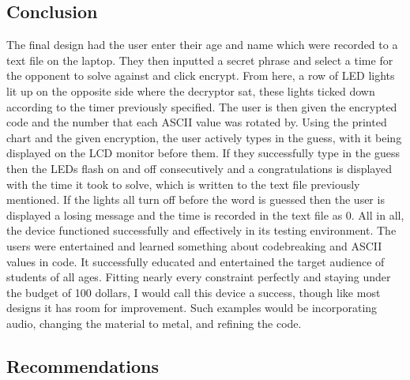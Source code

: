 \documentclass[conference]{IEEEtran}
\begin{document}
\subsection{Conclusion}

\par The final design had the user enter their age and name which were recorded to a text file on the laptop. They then inputted a secret phrase and select a time for the opponent to solve against and click encrypt. From here, a row of LED lights lit up on the opposite side where the decryptor sat, these lights ticked down according to the timer previously specified. The user is then given the encrypted code and the number that each ASCII value was rotated by. Using the printed chart and the given encryption, the user actively types in the guess, with it being displayed on the LCD monitor before them. If they successfully type in the guess then the LEDs flash on and off consecutively and a congratulations is displayed with the time it took to solve, which is written to the text file previously mentioned. If the lights all turn off before the word is guessed then the user is displayed a losing message and the time is recorded in the text file as 0. All in all, the device functioned successfully and effectively in its testing environment. The users were entertained and learned something about codebreaking and ASCII values in code. It successfully educated and entertained the target audience of students of all ages. Fitting nearly every constraint perfectly and staying under the budget of 100 dollars, I would call this device a success, though like most designs it has room for improvement. Such examples would be incorporating audio, changing the material to metal, and refining the code.

\subsection{Recommendations}
\end{document}
